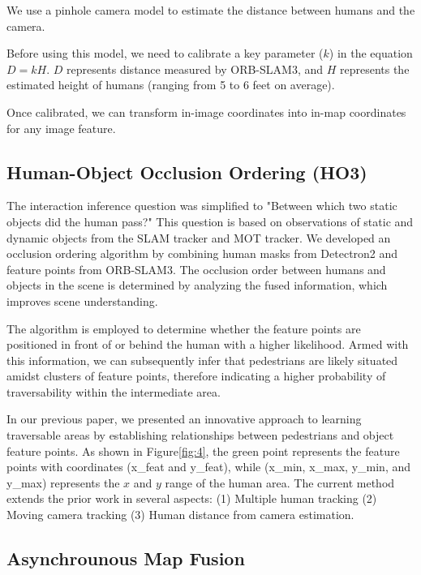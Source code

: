 \documentclass[letterpaper, 10 pt, conference]{ieeeconf}
\begin{document}
We use a pinhole camera model to estimate the distance between humans and the camera. 

Before using this model, we need to calibrate a key parameter ($k$) in the equation $D=kH$. $D$ represents distance measured by ORB-SLAM3, and $H$ represents the estimated height of humans (ranging from 5 to 6 feet on average). 

Once calibrated, we can transform in-image coordinates into in-map coordinates for any image feature.

\subsection{Human-Object Occlusion Ordering (HO3)}\label{sec:D}

The interaction inference question was simplified to "Between which two static objects did the human pass?" This question is based on observations of static and dynamic objects from the SLAM tracker and MOT tracker. We developed an occlusion ordering algorithm by combining human masks from Detectron2 and feature points from ORB-SLAM3. The occlusion order between humans and objects in the scene is determined by analyzing the fused information, which improves scene understanding.

The algorithm is employed to determine whether the feature points are positioned in front of or behind the human with a higher likelihood. Armed with this information, we can subsequently infer that pedestrians are likely situated amidst clusters of feature points, therefore indicating a higher probability of traversability within the intermediate area.

In our previous paper\cite{r19}, we presented an innovative approach to learning traversable areas by establishing relationships between pedestrians and object feature points. As shown in Figure\ref{fig:4}, the green point represents the feature points with coordinates (x\_feat and y\_feat), while (x\_min, x\_max, y\_min, and y\_max) represents the $x$ and $y$ range of the human area.  The current method extends the prior work\cite{r19} in several aspects: (1) Multiple human tracking (2) Moving camera tracking (3) Human distance from camera estimation. 

\figC

\subsection{Asynchrounous Map Fusion}\label{sec:E}
\end{document}
